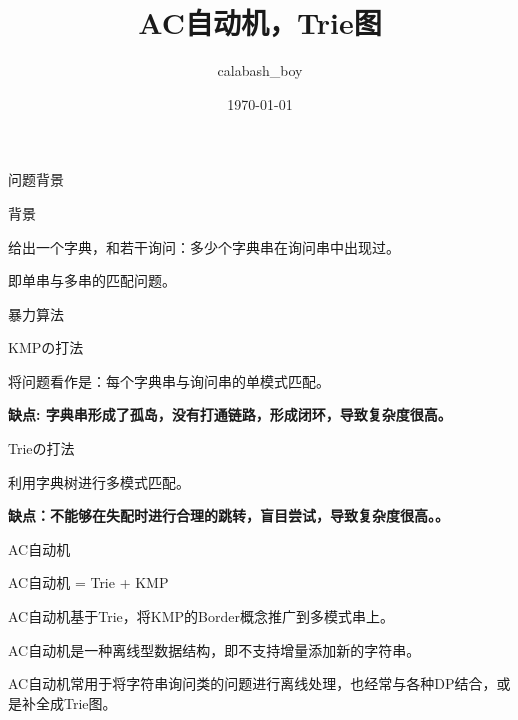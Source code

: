 \documentclass{ctexbeamer}		%
\date{}	%
\title[String]{AC自动机，Trie图}	%
\author[calabash\_boy]{calabash\_boy} %
\date{\today}
\begin{document}


\begin{frame}	

\titlepage	%
	
\end{frame}		

\begin{frame}{问题背景}

\begin{block}{背景}

给出一个字典，和若干询问：多少个字典串在询问串中出现过。

即单串与多串的匹配问题。

\end{block}
    
\end{frame}

\begin{frame}{暴力算法}

\begin{block}{KMPの打法}

将问题看作是：每个字典串与询问串的单模式匹配。

\pause

\textbf{缺点: 字典串形成了孤岛，没有打通链路，形成闭环，导致复杂度很高。}

\end{block}

\pause

\begin{block}{Trieの打法}

利用字典树进行多模式匹配。

\pause

\textbf{缺点：不能够在失配时进行合理的跳转，盲目尝试，导致复杂度很高。。}

\end{block}

\end{frame}

\begin{frame}{AC自动机}

\begin{block}{AC自动机 = Trie + KMP}

AC自动机基于Trie，将KMP的Border概念推广到多模式串上。

\pause

AC自动机是一种离线型数据结构，即不支持增量添加新的字符串。

\pause

AC自动机常用于将字符串询问类的问题进行离线处理，也经常与各种DP结合，或是补全成Trie图。

\end{block}

\end{frame}
\end{document}
